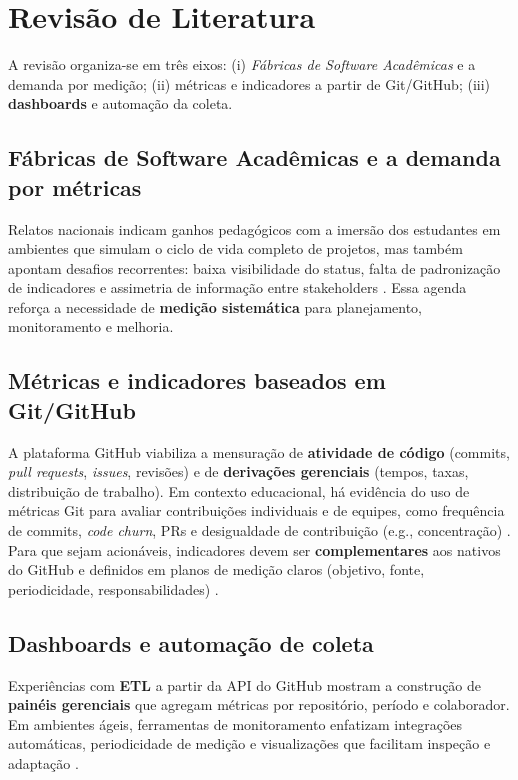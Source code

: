 \documentclass[
	12pt,
	openright,
	oneside,
	a4paper,
	brazil
]{abntex2}
\begin{document}
\section{Revisão de Literatura}

A revisão organiza-se em três eixos: (i) \textit{Fábricas de Software Acadêmicas} e a demanda por medição; (ii) métricas e indicadores a partir de Git/GitHub; (iii) \textbf{dashboards} e automação da coleta.

\subsection{Fábricas de Software Acadêmicas e a demanda por métricas}
Relatos nacionais indicam ganhos pedagógicos com a imersão dos estudantes em ambientes que simulam o ciclo de vida completo de projetos, mas também apontam desafios recorrentes: baixa visibilidade do status, falta de padronização de indicadores e assimetria de informação entre stakeholders \cite{dos2021experiencia,romanha2016modelo,neto2017relato,oliveira2017conduccao,romanha2015fabrica,almeida2006liccoes}. Essa agenda reforça a necessidade de \textbf{medição sistemática} para planejamento, monitoramento e melhoria.

\subsection{Métricas e indicadores baseados em Git/GitHub}
A plataforma GitHub viabiliza a mensuração de \textbf{atividade de código} (commits, \textit{pull requests}, \textit{issues}, revisões) e de \textbf{derivações gerenciais} (tempos, taxas, distribuição de trabalho). Em contexto educacional, há evidência do uso de métricas Git para avaliar contribuições individuais e de equipes, como frequência de commits, \textit{code churn}, PRs e desigualdade de contribuição (e.g., concentração) \cite{hamer2021using}. Para que sejam acionáveis, indicadores devem ser \textbf{complementares} aos nativos do GitHub e definidos em planos de medição claros (objetivo, fonte, periodicidade, responsabilidades) \cite{barbosaIndicadoresConjunto2016,kitchenham2010s}.

\subsection{Dashboards e automação de coleta}
Experiências com \textbf{ETL} a partir da API do GitHub mostram a construção de \textbf{painéis gerenciais} que agregam métricas por repositório, período e colaborador. Em ambientes ágeis, ferramentas de monitoramento enfatizam integrações automáticas, periodicidade de medição e visualizações que facilitam inspeção e adaptação \cite{ozkan2019agile,temitope2020software,dos2020usoTrello}.
\end{document}
